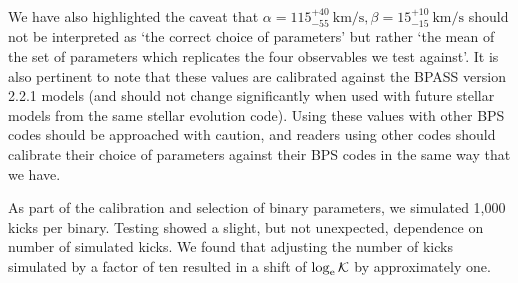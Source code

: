 
We have also highlighted the caveat that $\alpha=115^{+40}_{-55}~\unit{\kilo\meter\per\second}, \beta=15^{+10}_{-15}~\unit{\kilo\meter\per\second}$ should not be interpreted as `the correct choice of parameters' but rather `the mean of the set of parameters which replicates the four observables we test against'. It is also pertinent to note that these values are calibrated against the BPASS version 2.2.1 models (and should not change significantly when used with future stellar models from the same stellar evolution code). Using these values with other BPS codes should be approached with caution, and readers using other codes should calibrate their choice of parameters against their BPS codes in the same way that we have.

As part of the calibration and selection of binary parameters, we simulated 1,000 kicks per binary. Testing showed a slight, but not unexpected, dependence on number of simulated kicks. We found that adjusting the number of kicks simulated by a factor of ten resulted in a shift of $\loge\mathcal{K}$ by approximately one.


